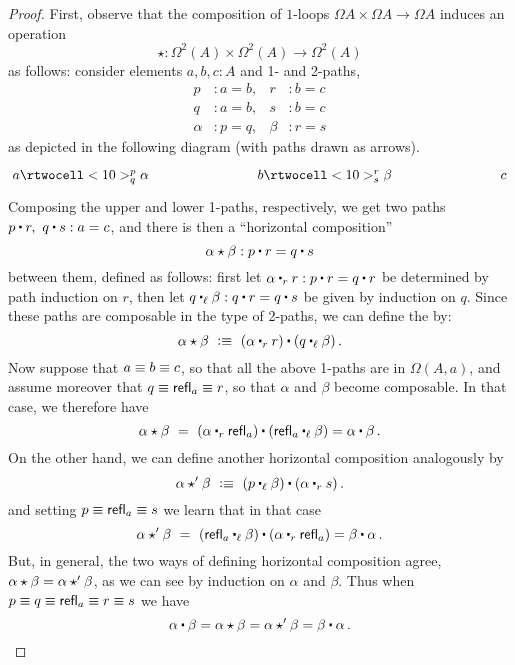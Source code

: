 \begin{proof}
First, observe that the composition of $1$-loops $\Omega A\times \Omega A\to \Omega A$ induces an operation 
\[
\star : \Omega^2(A)\times \Omega^2(A)\to \Omega^2(A)
\]
as follows: consider elements $a, b, c : A$ and 1- and 2-paths,
%
\begin{align*}
  p &: a = b,       &       r &: b = c \\
  q &: a = b,       &       s &: b = c \\
  \alpha &: p = q,  &   \beta &: r = s
\end{align*}
%
as depicted in the following diagram (with paths drawn as arrows).
\[
 \xymatrix@+5em{
   {a} \rtwocell<10>^p_q{\alpha}
   &
   {b} \rtwocell<10>^r_s{\beta}
   &
   {c}
 }
\]
Composing the upper and lower 1-paths, respectively, we get two paths $p\ct r,\ q\ct s : a = c$, and there is then a ``horizontal composition''
%
\begin{equation*}
  \alpha\hct\beta : p\ct r = q\ct s
\end{equation*}
%
between them, defined as follows: first let $\alpha \rightwhisker r : p\ct r = q\ct r$ be determined by path induction on $r$, then let $q\leftwhisker \beta : q\ct r = q\ct s$ be given by induction on $q$.  Since these paths are composable in the type of 2-paths, we can define the 
%
%
by:
\[
\alpha\hct\beta\ \defeq\ (\alpha\rightwhisker r) \ct (q\leftwhisker \beta)\, .
\]
Now suppose that $a \equiv  b \equiv  c$, so that all the above 1-paths are in $\Omega(A,a)$, and assume moreover that $q \equiv  \mathsf{refl}_{a}\equiv  r$, so that $\alpha$ and $\beta$ become composable.  In that case, we therefore have
\[
\alpha\hct\beta\ =\ (\alpha\rightwhisker\refl{a}) \ct (\refl{a}\leftwhisker \beta) = \alpha \ct \beta\, .
\]
On the other hand, we can define another horizontal composition analogously by
\[
\alpha\hct'\beta\ \defeq\ (p\leftwhisker \beta)\ct (\alpha\rightwhisker s)\, .
\]
and setting $p \equiv  \mathsf{refl}_{a}\equiv  s$ we learn that in that case 
\[
\alpha\hct'\beta\ =\ (\refl{a}\leftwhisker \beta)\ct (\alpha\rightwhisker \refl{a}) = \beta\ct\alpha\, .
\]
But, in general, the two ways of defining horizontal composition agree, $\alpha\star\beta = \alpha\star'\beta$, as we can see by induction on $\alpha$ and $\beta$.  Thus when $p \equiv  q \equiv  \mathsf{refl}_{a} \equiv  r\equiv  s$ we have
\[\alpha \ct \beta = \alpha\hct\beta = \alpha\hct'\beta = \beta\ct\alpha\,.
\qedhere
\]
\end{proof}

